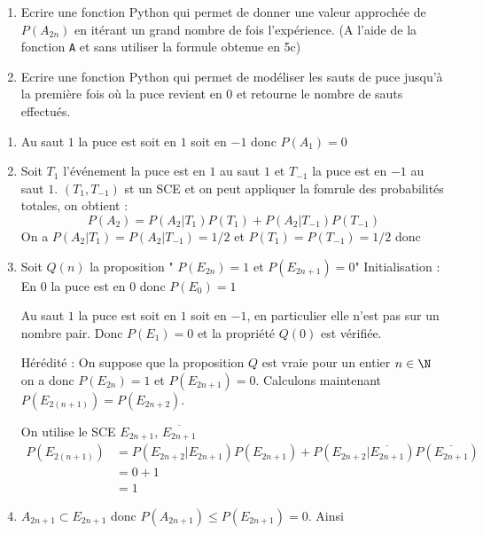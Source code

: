 \documentclass[a4paper, 11pt,reqno]{article}
\begin{document}
\begin{exercice}
\begin{enumerate}
\item Ecrire une fonction Python qui permet de donner une valeur approchée de $P(A_{2n})$ en itérant un grand nombre de fois l'expérience. (A l'aide de la fonction \texttt{A} et sans utiliser la formule obtenue en 5c) 

\item Ecrire une fonction Python qui permet de modéliser les sauts de puce jusqu'à la première fois où la puce revient en $0$ et retourne le nombre de sauts effectués. 
 \end{enumerate}
 
 
\end{exercice}

\begin{correction}
\begin{enumerate}


\item Au saut $1$ la puce est soit en $1$ soit en $-1$ donc $P(A_1)=0$
\item Soit $T_1$ l'événement la puce est en $1$ au saut $1$ et $T_{-1}$ la puce est en $-1$ au saut $1$. $(T_1,T_{-1})$  st un SCE et on peut appliquer la fomrule des probabilités totales, on obtient :
$$P(A_2)= P(A_2 |T_1) P(T_1)  +P(A_2|T_{-1})P(T_{-1}) $$
On a $P(A_2|T_1) = P(A_2| T_{-1}) =1/2$  et $P(T_1) =P(T_{-1}) =1/2$ 
donc 
\item Soit $Q(n) $ la proposition " $P(E_{2n}) =1$ et $P(E_{2n+1} ) = 0 $" 
Initialisation  : 
En $0$ la puce est en $0$ donc $P(E_0) =1$

Au saut $1$ la puce est soit en $1$ soit en $-1$, en particulier elle n'est pas sur un nombre pair. Donc  $P(E_1)=0$ et la propriété $Q(0) $ est vérifiée. 

Hérédité : On suppose que la proposition $Q$ est vraie pour un entier $n\in \N$ on a donc 
$P(E_{2n}) =1$ et $P(E_{2n+1}) =0$. Calculons maintenant 
$P(E_{2(n+1)} )= P(E_{2n+2})$. 

On utilise le SCE $E_{2n+1}$, $\overline{E_{2n+1}}$
\begin{align*}
P(E_{2(n+1)} ) &= P(E_{2n+2}| E_{2n+1}) P(E_{2n+1}) + P(E_{2n+2}| \overline{E_{2n+1}}) P(\overline{E_{2n+1}})\\
&= 0 + 1 \\
&=1 
\end{align*}


\item $A_{2n+1}\subset E_{2n+1}$ donc $P(A_{2n+1} ) \leq P(E_{2n+1})=0$. Ainsi 
 

\end{enumerate}
\end{correction}
\end{document}
